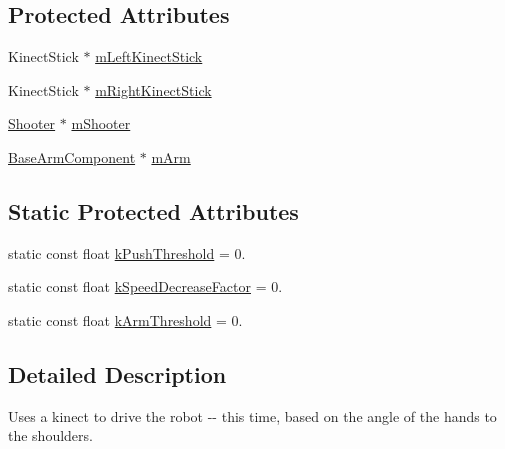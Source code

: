 \subsection*{\-Protected \-Attributes}
\begin{DoxyCompactItemize}
\item 
\-Kinect\-Stick $\ast$ \hyperlink{class_kinect_angle_controller_ad07d09210e69dbf154f0d3494d18652a}{m\-Left\-Kinect\-Stick}
\item 
\-Kinect\-Stick $\ast$ \hyperlink{class_kinect_angle_controller_a38a982263c4ebc386ecc1d82e728e43a}{m\-Right\-Kinect\-Stick}
\item 
\hyperlink{class_shooter}{\-Shooter} $\ast$ \hyperlink{class_kinect_angle_controller_af4bdf40b256bdb2ea87258800def0219}{m\-Shooter}
\item 
\hyperlink{class_base_arm_component}{\-Base\-Arm\-Component} $\ast$ \hyperlink{class_kinect_angle_controller_a8366332ac310668c70efa233d7d22c59}{m\-Arm}
\end{DoxyCompactItemize}
\subsection*{\-Static \-Protected \-Attributes}
\begin{DoxyCompactItemize}
\item 
static const float \hyperlink{class_kinect_angle_controller_a4e98aadf5a3484ef8ccfbf75bda1e0b7}{k\-Push\-Threshold} = 0.
\item 
static const float \hyperlink{class_kinect_angle_controller_a6bad6841da286fbbc89def97eccfc309}{k\-Speed\-Decrease\-Factor} = 0.
\item 
static const float \hyperlink{class_kinect_angle_controller_a7e09724d093f7f0a78c37bfe9da1f9c7}{k\-Arm\-Threshold} = 0.
\end{DoxyCompactItemize}


\subsection{\-Detailed \-Description}
\-Uses a kinect to drive the robot -\/-\/ this time, based on the angle of the hands to the shoulders. 

